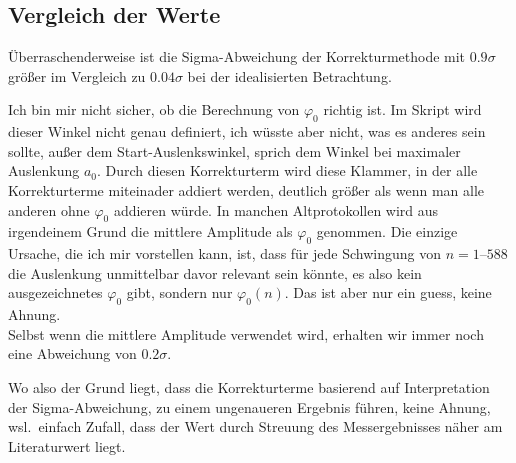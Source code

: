 \subsection{Vergleich der Werte}
Überraschenderweise ist die Sigma-Abweichung der Korrekturmethode mit \(0.9\sigma\) größer im Vergleich zu \(0.04\sigma\) bei der idealisierten Betrachtung. 

Ich bin mir nicht sicher, ob die Berechnung von \(\varphi_0\) richtig ist. Im Skript wird dieser Winkel nicht genau definiert, ich wüsste aber nicht, was es anderes sein sollte, außer dem Start-Auslenkswinkel, sprich dem Winkel bei maximaler Auslenkung \(a_0\). Durch diesen Korrekturterm wird diese Klammer, in der alle Korrekturterme miteinader addiert werden, deutlich größer als wenn man alle anderen ohne \(\varphi_0\) addieren würde. In manchen Altprotokollen wird aus irgendeinem Grund die mittlere Amplitude als \(\varphi_0\) genommen. Die einzige Ursache, die ich mir vorstellen kann, ist, dass für jede Schwingung von \(n=\numrange{1}{588}\) die Auslenkung unmittelbar davor relevant sein könnte, es also kein ausgezeichnetes \(\varphi_0\) gibt, sondern nur \(\varphi_0(n)\). Das ist aber nur ein guess, keine Ahnung. \\Selbst wenn die mittlere Amplitude verwendet wird, erhalten wir immer noch eine Abweichung von \(0.2\sigma\). 

Wo also der Grund liegt, dass die Korrekturterme basierend auf Interpretation der Sigma-Abweichung, zu einem ungenaueren Ergebnis führen, keine Ahnung, wsl.\ einfach Zufall, dass der Wert durch Streuung des Messergebnisses näher am Literaturwert liegt.
